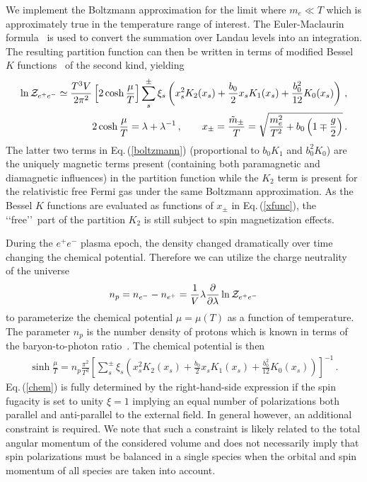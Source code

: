 \documentclass[a4paper]{article}
\newcommand{\req}[1]{Eq.\,(\ref{#1})}
\begin{document}
We implement the Boltzmann approximation for the limit where $m_e\ll T$ which is approximately true in the temperature range of interest. The Euler-Maclaurin formula~\cite{abramowitz1988handbook} is used to convert the summation over Landau levels into an integration. The resulting partition function can then be written in terms of modified Bessel $K$ functions~\cite{letessier2002hadrons} of the second kind, yielding
\begin{align}
    \label{boltzmann}
    \ln{\cal Z}_{e^{+}e^{-}}\simeq\frac{T^{3}V}{2\pi^{2}}\left[2\cosh{\frac{\mu}{T}}\right]\sum_{s}^{\pm}\xi_{s}\left(x_{s}^{2}K_{2}(x_{s})+\frac{b_{0}}{2}x_{s}K_{1}(x_{s})+\frac{b_{0}^{2}}{12}K_{0}(x_{s})\right)\,,\\
    \label{xfunc}
    2\cosh{\frac{\mu}{T}}=\lambda+\lambda^{-1}\,,\qquad
    x_{\pm}=\frac{{\tilde m}_{\pm}}{T}=\sqrt{\frac{m_{e}^{2}}{T^{2}}+b_{0}\left(1\mp\frac{g}{2}\right)}\,.
\end{align}
The latter two terms in \req{boltzmann} (proportional to $b_{0}K_{1}$ and $b_{0}^{2}K_{0}$) are the uniquely magnetic terms present (containing both paramagnetic and diamagnetic influences) in the partition function while the $K_{2}$ term is present for the relativistic free Fermi gas under the same Boltzmann approximation. As the Bessel $K$ functions are evaluated as functions of $x_{\pm}$ in \req{xfunc}, the \lq\lq free\rq\rq\ part of the partition $K_{2}$ is still subject to spin magnetization effects.

During the $e^{+}e^{-}$ plasma epoch, the density changed dramatically over time changing the chemical potential. Therefore we can utilize the charge neutrality~\cite{rafelski2023short,letessier2002hadrons} of the universe
\begin{align}
    \label{chargeneutrality}
    n_{p}=n_{e^{-}}-n_{e^{+}}=\frac{1}{V}\lambda\frac{\partial}{\partial\lambda}\ln{\cal Z}_{e^{+}e^{-}}
\end{align}
to parameterize the chemical potential $\mu=\mu(T)$ as a function of temperature. The parameter $n_{p}$ is the number density of protons which is known in terms of the baryon-to-photon ratio~\cite{workman2022pdg}. The chemical potential is then
\begin{align}
    \label{chem}
    \sinh{\frac{\mu}{T}}=n_{p}\frac{\pi^{2}}{T^{3}}\left[\sum_{s}^{\pm}\xi_{s}\left(x_{s}^{2}K_{2}(x_{s})+\frac{b_{0}}{2}x_{s}K_{1}(x_{s})+\frac{b_{0}^{2}}{12}K_{0}(x_{s})\right)\right]^{-1}\,.
\end{align}
\req{chem} is fully determined by the right-hand-side expression if the spin fugacity is set to unity $\xi=1$ implying an equal number of polarizations both parallel and anti-parallel to the external field. In general however, an additional constraint is required. We note that such a constraint is likely related to the total angular momentum of the considered volume and does not necessarily imply that spin polarizations must be balanced in a single species when the orbital and spin momentum of all species are taken into account.
\end{document}
